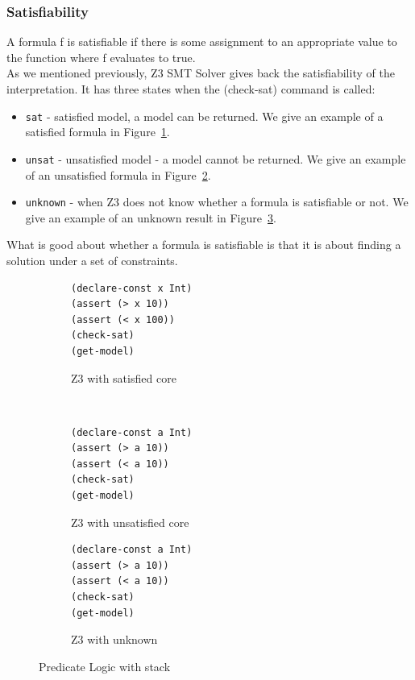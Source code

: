 \documentclass[a4paper]{report}
\begin{document}
\subsubsection{Satisfiability}
A formula f is satisfiable if there is some assignment to an appropriate value to the function where f evaluates to true.\\
As we mentioned previously, Z3 SMT Solver gives back the satisfiability of the interpretation. It has three states when the (check-sat) command is called:
\begin{itemize}
\item \texttt{sat} - satisfied model, a model can be returned. We give an example of a satisfied formula in Figure~\ref{fig:Z3 with satisfied core}.
\item \texttt{unsat} - unsatisfied model - a model cannot be returned. We give an example of an unsatisfied formula in Figure~\ref{fig:Z3 with unsatisfied core}.
\item \texttt{unknown} - when Z3 does not know whether a formula is satisfiable or not. We give an example of an unknown result in Figure~\ref{fig:Z3 with unknown}.
\end{itemize}
What is good about whether a formula is satisfiable is that it is about finding a solution under a set of constraints. 
\begin{figure}[!htb]
\centering
\begin{subfigure}[b]{\textwidth}
\lstset{numbers=left, showspaces=false,
    showstringspaces=false, tabsize=2, breaklines=true,
    xleftmargin=5.0ex,
}
\centering
\begin{lstlisting}[frame=single]
(declare-const x Int)
(assert (> x 10))
(assert (< x 100))
(check-sat)
(get-model)
\end{lstlisting}
\caption{Z3 with satisfied core}
\label{fig:Z3 with satisfied core}
\end{subfigure}\\
\begin{subfigure}[b]{\textwidth}
\lstset{numbers=left, showspaces=false,
    showstringspaces=false, tabsize=2, breaklines=true,
    xleftmargin=5.0ex,
}
\begin{lstlisting}[frame=single]
(declare-const a Int)
(assert (> a 10))
(assert (< a 10))
(check-sat)
(get-model)
\end{lstlisting}
\caption{Z3 with unsatisfied core}
\label{fig:Z3 with unsatisfied core}
\end{subfigure}
\begin{subfigure}[b]{\textwidth}
\lstset{numbers=left, showspaces=false,
    showstringspaces=false, tabsize=2, breaklines=true,
    xleftmargin=5.0ex,
}
\begin{lstlisting}[frame=single]
(declare-const a Int)
(assert (> a 10))
(assert (< a 10))
(check-sat)
(get-model)
\end{lstlisting}
\caption{Z3 with unknown}
\label{fig:Z3 with unknown}
\end{subfigure}
\caption{Predicate Logic with stack}
\label{fig:Predicate Logic with stack}
\end{figure} 
\end{document}
